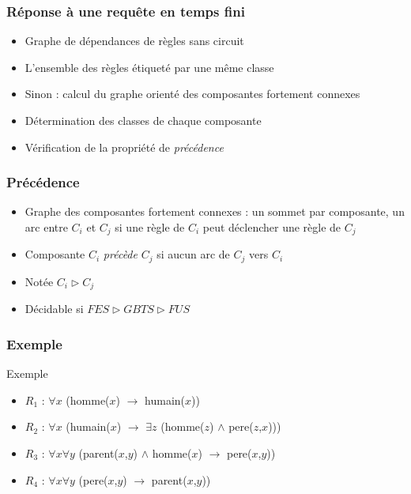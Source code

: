 
\begin{frame}
	\frametitle{Réponse à une requête en temps fini}
	\begin{itemize}
		\item Graphe de dépendances de règles sans circuit
		\item L'ensemble des règles étiqueté par une même classe 
		\item Sinon : 
		calcul du graphe orienté des composantes fortement connexes
		\item Détermination des classes de chaque composante
		\item Vérification de la propriété de {\em précédence}
	\end{itemize}
\end{frame}

\begin{frame}
	\frametitle{Précédence}
	\begin{itemize}
		\item Graphe des composantes fortement connexes : un sommet par composante, un
		arc entre $C_i$ et $C_j$ si une règle de $C_i$ peut déclencher une règle de $C_j$
		\item Composante $C_i$ {\em précède} $C_j$ si aucun arc de $C_j$ vers $C_i$
		\item Notée $C_i \triangleright C_j$
		\item Décidable si $FES \triangleright GBTS \triangleright FUS$
	\end{itemize}
\end{frame}

\begin{frame}
	\frametitle{Exemple}
	\begin{exampleblock}{Exemple}
	\begin{itemize}
		\item $R_1$ : $\forall x$ (homme($x$) $\rightarrow$ humain($x$))
		\item $R_2$ : $\forall x$ (humain($x$) $\rightarrow$ $\exists z$ (homme($z$)
		$\wedge$ pere($z$,$x$)))
		\item $R_3$ : $\forall x \forall y$ (parent($x$,$y$) $\wedge$ homme($x$)
		$\rightarrow$ pere($x$,$y$))
		\item $R_4$ : $\forall x \forall y$ (pere($x$,$y$) $\rightarrow$
		parent($x$,$y$))
	\end{itemize}
	\end{exampleblock}
	\begin{figure}
	\end{figure}
\end{frame}

